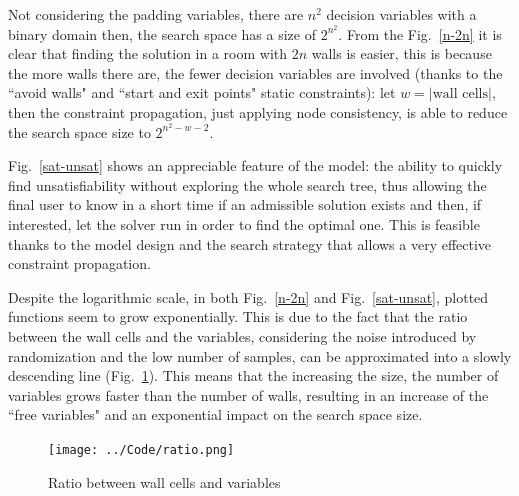 \documentclass[12pt]{article}
\newcommand*{\card}[1]{\lvert #1 \rvert}
\begin{document}
Not considering the padding variables, there are $n^2$ decision variables
with a binary domain then, the search space has a size of $2^{n^2}$.
From the Fig.~\ref{n-2n} it is clear that finding the solution in a room with
$2n$
walls
is easier, this is because the more walls there are, the fewer decision
variables are involved (thanks to the ``avoid walls" and ``start and exit
points" static constraints):
let $w = \card{\text{wall cells}}$, then the constraint propagation, just
applying node consistency, is able to reduce the search space size to $2^{n^2
-w-2}$.

Fig.~\ref{sat-unsat} shows an appreciable feature of the model:
the ability to quickly find unsatisfiability without exploring the whole search
tree, thus allowing the final user to know in a short time if an admissible
solution exists and then, if interested,
let the solver run in order to find the optimal one.
This is feasible thanks to the model design and the search strategy that allows
a very effective constraint propagation.

Despite the logarithmic scale, in both Fig.~\ref{n-2n} and
Fig.~\ref{sat-unsat}, plotted functions seem to grow exponentially.
This is due to the fact that the ratio between the wall cells and the
variables, considering the noise introduced by randomization
and the low number of samples, can be approximated into a slowly
descending line (Fig.~\ref{ratio}). This means that the increasing the size,
the number of variables grows faster than the number of walls, resulting in  an
increase of the ``free variables" and an exponential impact on the search space
size.

\begin{figure}[H]
  \centering
  \texttt{[image: ../Code/ratio.png]}
  \caption{Ratio between wall cells and variables}
  \label{ratio}
\end{figure}
\end{document}
